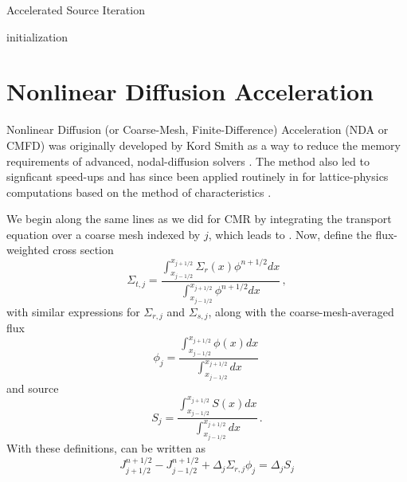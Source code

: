 \begin{algorithm}
 \label{alg:accel}
 \caption{Accelerated Source Iteration}
  initialization\;
\end{algorithm}



\section*{Nonlinear Diffusion Acceleration}

Nonlinear Diffusion (or Coarse-Mesh, Finite-Difference) Acceleration (NDA
or CMFD) was originally developed by Kord Smith as a way to reduce the 
memory requirements of advanced, nodal-diffusion solvers \cite{smith1983nms}.  
The method also
led to signficant speed-ups and has since been applied routinely in 
for lattice-physics computations based on the method of characteristics
\cite{2002}.  

We begin along the same lines as we did for CMR by integrating the 
transport equation over a coarse mesh indexed by $j$, which leads to 
.  Now, define the flux-weighted cross section
\begin{equation}
 \Sigma_{t,j} = \frac{\int^{x_{j+1/2}}_{x_{j-1/2}} \Sigma_r(x) \phi^{n+1/2} dx}
                     {\int^{x_{j+1/2}}_{x_{j-1/2}}\phi^{n+1/2} dx} \, ,
\end{equation}
with similar expressions for $\Sigma_{r,j}$ and $\Sigma_{s,j}$, along 
with the coarse-mesh-averaged flux
\begin{equation}
 \phi_{j} = \frac{\int^{x_{j+1/2}}_{x_{j-1/2}} \phi(x) dx}
              {\int^{x_{j+1/2}}_{x_{j-1/2}} dx} \, 
\end{equation}
and source
\begin{equation}
 S_{j} = \frac{\int^{x_{j+1/2}}_{x_{j-1/2}} S(x) dx}
              {\int^{x_{j+1/2}}_{x_{j-1/2}} dx} \, .
\end{equation} 
With these definitions,  can be written as
\begin{equation}
 J^{n+1/2}_{j+1/2} - J^{n+1/2}_{j-1/2} 
   + \Delta_j \Sigma_{r,j} \phi_j = \Delta_j S_j
\end{equation}

